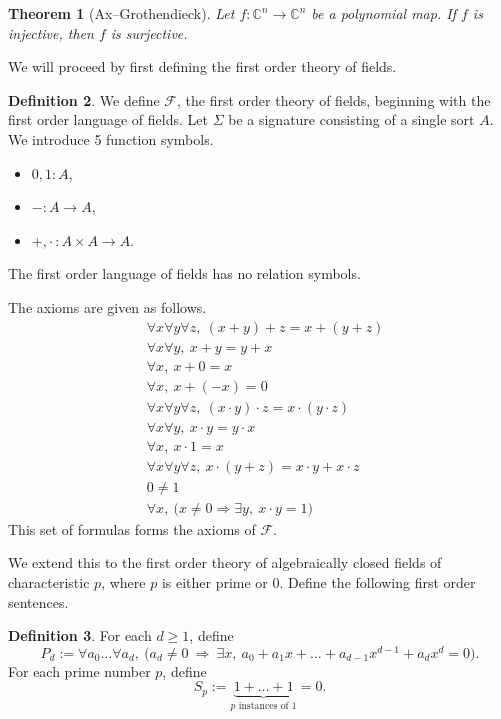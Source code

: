 \documentclass[12pt]{article}
\theoremstyle{plain}
\newtheorem{thm}{Theorem}[subsection]
\theoremstyle{definition}
\newtheorem{defn}[thm]{Definition}
\newcommand{\bb}[1]{\mathbb{#1}}
\newcommand{\call}[1]{\mathcal{#1}}
\newcommand{\lto}{\longrightarrow}
\begin{document}
\begin{thm}[Ax--Grothendieck]\label{thm:ax_grothendieck}
Let $f: \bb{C}^n \lto \bb{C}^n$ be a polynomial map. If $f$ is injective, then $f$ is surjective.
\end{thm}

We will proceed by first defining the first order theory of fields.

\begin{defn}\label{def:FoT_fields}
We define $\call{F}$, the first order theory of fields, beginning with the first order language of fields. Let $\Sigma$ be a signature consisting of a single sort $A$. We introduce 5 function symbols.
\begin{itemize}
\item $0,1: A$,
\item $-: A \lto A$,
\item $+, \cdot\,: A \times A \lto A$.
\end{itemize}
The first order language of fields has no relation symbols.

The axioms are given as follows.
\begin{align}
&\forall x\forall y\forall z,\ (x+y)+z = x+(y+z)\\
&\forall x\forall y,\ x+y = y+x\\
&\forall x,\ x+0 = x\\
&\forall x,\ x+(-x) = 0\\
&\forall x\forall y\forall z,\ (x\cdot y)\cdot z = x\cdot (y\cdot z)\\
&\forall x\forall y,\ x\cdot y = y\cdot x\\
&\forall x,\ x\cdot 1 = x\\
&\forall x\forall y\forall z,\ x\cdot(y+z) = x\cdot y + x\cdot z\\
& 0 \neq 1\\
&\forall x,\ \big(x \neq 0 \Rightarrow \exists y,\ x\cdot y = 1\big)
\end{align}
This set of formulas forms the axioms of $\call{F}$.
\end{defn}

We extend this to the first order theory of algebraically closed fields of characteristic $p$, where $p$ is either prime or $0$. Define the following first order sentences.

\begin{defn}
For each $d \geq 1$, define
\[
P_d := \forall a_0\ldots\forall a_d,\ \big(a_d \neq 0\ \Rightarrow\ \exists x,\ a_0 + a_1 x + \ldots + a_{d-1} x^{d-1} + a_d x^d = 0\big).
\]
For each prime number $p$, define
\begin{equation}\label{eq:characteristic}
S_p := \underbrace{1 + \ldots + 1}_{p\text{ instances of }1} = 0.
\end{equation}
\end{defn}
\end{document}
